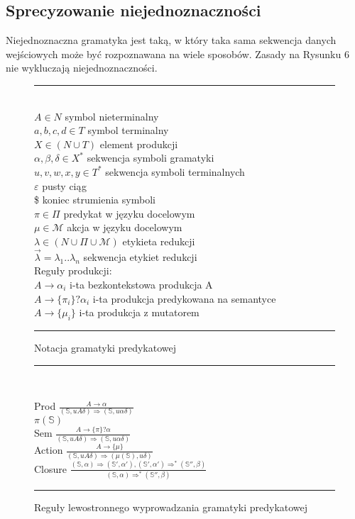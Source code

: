 ﻿\subsection{Sprecyzowanie niejednoznaczności}
Niejednoznaczna gramatyka jest taką, w który taka sama sekwencja danych wejściowych
może być rozpoznawana na wiele sposobów.
Zasady na Rysunku 6 nie wykluczają niejednoznaczności. 

\begin{figure}[h]
\noindent\rule{\linewidth}{1pt} \\
\( A \in N \) symbol nieterminalny \\
\( a,b,c,d \in T \) symbol terminalny \\
\( X \in (N \cup T) \) element produkcji \\
\( \alpha,\beta,\delta \in X^* \) sekwencja symboli gramatyki \\
\( u,v,w,x,y \in T^* \) sekwencja symboli terminalnych \\
\( \varepsilon \) pusty ciąg \\
\$ koniec strumienia symboli \\
\( \pi \in \Pi \) predykat w języku docelowym \\
\( \mu \in \mathcal{M} \) akcja w języku docelowym \\
\( \lambda \in (N \cup \Pi \cup \mathcal{M}) \) etykieta redukcji \\
\( \overset{\rightarrow}{\lambda} = \lambda_1 ..\lambda_n\) sekwencja etykiet redukcji \\
Reguły produkcji:\\
\( A \rightarrow \alpha_i \) i-ta bezkontekstowa produkcja A \\
\( A \rightarrow \{ \pi_i \} ? \alpha_i \) i-ta produkcja predykowana na semantyce \\
\( A \rightarrow \{ \mu_i \} \) i-ta produkcja z mutatorem \\
\noindent\rule{\linewidth}{1pt} 
\caption{Notacja gramatyki predykatowej}
\end{figure}

\begin{figure}[h]
\noindent\rule{\linewidth}{1pt} \\
\begin{adjustwidth}{2cm}{}
Prod \( \frac{A \rightarrow \alpha}{ (\mathbb{S}, uA\delta) \Rightarrow (\mathbb{S}, u\alpha\delta)} \) 
\\
\( \pi(\mathbb{S}) \)
\\
Sem \( \frac{A \rightarrow \{ \pi \} ? \alpha}{ (\mathbb{S}, uA\delta) \Rightarrow (\mathbb{S}, u\alpha\delta)} \) 
\\
Action \( \frac{A \rightarrow \{ \mu \} }{ (\mathbb{S}, uA\delta) \Rightarrow (\mu (\mathbb{S}), u\delta)} \) 
\\
Closure \( \frac{ (\mathbb{S},\alpha) \Rightarrow (\mathbb{S'},\alpha'),
(\mathbb{S'},\alpha') \Rightarrow^* (\mathbb{S''},\beta) }{(\mathbb{S},\alpha) \Rightarrow^* (\mathbb{S''},\beta)} \) 
\\
\end{adjustwidth}
\noindent\rule{\linewidth}{1pt}
\caption{Reguły lewostronnego wyprowadzania gramatyki predykatowej}
\end{figure}

